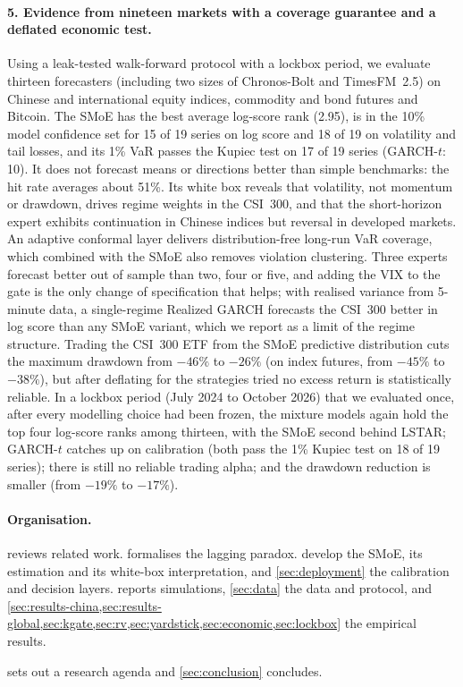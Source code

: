 \paragraph{5. Evidence from nineteen markets with a coverage guarantee and a deflated economic test.}
Using a leak-tested walk-forward protocol with a lockbox period, we evaluate thirteen forecasters
(including two sizes of Chronos-Bolt and TimesFM~2.5) on Chinese and international equity indices,
commodity and bond futures and Bitcoin. The SMoE has the best average log-score rank (2.95), is in
the 10\% model confidence set for 15 of 19 series on log score and 18 of 19 on volatility and tail
losses, and its 1\% VaR passes the Kupiec test on 17 of 19 series (GARCH-$t$: 10). It does not
forecast means or directions better than simple benchmarks: the hit rate averages about 51\%. Its white box
reveals that volatility, not momentum or drawdown, drives regime weights in the CSI~300, and that the
short-horizon expert exhibits continuation in Chinese indices but reversal in developed markets. An
adaptive conformal layer delivers distribution-free long-run VaR coverage, which combined with the SMoE
also removes violation clustering. Three experts forecast better out of sample than two, four or five,
and adding the VIX to the gate is the only change of specification that helps; with realised
variance from 5-minute data, a single-regime Realized GARCH forecasts the CSI~300 better in log score
than any SMoE variant, which we report as a limit of the regime structure. Trading the CSI~300 ETF from the SMoE predictive
distribution cuts the maximum drawdown from $-46\%$ to $-26\%$ (on index futures, from $-45\%$ to
$-38\%$), but after deflating for the strategies tried no excess return is statistically reliable.
In a lockbox period (July 2024 to October 2026) that we evaluated once, after every modelling choice
had been frozen, the mixture models again hold the top four log-score ranks among thirteen, with the
SMoE second behind LSTAR; GARCH-$t$ catches up on calibration (both pass the 1\% Kupiec test on 18 of
19 series);
there is still no reliable trading alpha; and the drawdown reduction is smaller (from $-19\%$ to
$-17\%$).

\paragraph{Organisation.}
 reviews related work.  formalises the lagging paradox.
 develop the SMoE, its estimation and its white-box
interpretation, and \cref{sec:deployment} the calibration and decision layers.
 reports simulations, \cref{sec:data} the data and protocol, and
\cref{sec:results-china,sec:results-global,sec:kgate,sec:rv,sec:yardstick,sec:economic,sec:lockbox}
the empirical results.

 sets out a research agenda and \cref{sec:conclusion} concludes.
